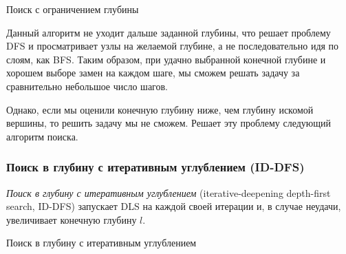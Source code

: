\begin{algorithm}[H]
\SetAlgoLined
{}

\caption{Поиск с ограничением глубины}  \label{algo:DLS}
\end{algorithm}

Данный алгоритм не уходит дальше заданной глубины, что решает проблему DFS и просматривает узлы на желаемой глубине, а не последовательно идя по слоям, как BFS. Таким образом, при удачно выбранной конечной глубине и хорошем выборе замен на каждом шаге, мы сможем решать задачу за сравнительно небольшое число шагов.

Однако, если мы оценили конечную глубину ниже, чем глубину искомой вершины, то решить задачу мы не сможем. Решает эту проблему следующий алгоритм поиска. 

\subsubsection{Поиск в глубину с итеративным углублением (ID-DFS)} \label{sec:ID-DFS}

\begin{definition}
    \textit{Поиск в глубину с итеративным углублением} (iterative-deepening depth-first search, ID-DFS) запускает DLS на каждой своей итерации и, в случае неудачи, увеличивает конечную глубину $l$.
\end{definition}

\begin{algorithm}[H]
\SetAlgoLined
{}

\caption{Поиск в глубину с итеративным углублением} \label{algo:ID-DFS}
\end{algorithm}

